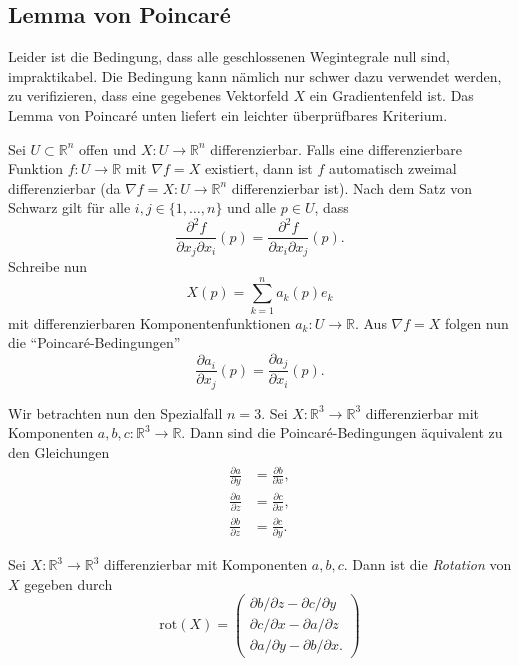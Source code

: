 \documentclass[../main.tex]{subfiles}
\begin{document}
\subsection*{Lemma von Poincaré}

Leider ist die Bedingung, dass alle geschlossenen Wegintegrale
null sind, impraktikabel.
Die Bedingung kann nämlich nur schwer dazu verwendet werden,
zu verifizieren, dass eine gegebenes Vektorfeld $X$
ein Gradientenfeld ist.
Das Lemma von Poincaré unten liefert ein leichter überprüfbares
Kriterium.

Sei $U \subset \mathbb{R}^n$ offen
und $X \colon U \to \mathbb{R}^n$ differenzierbar.
Falls eine differenzierbare Funktion
$f \colon U \to \mathbb{R}$ mit $\nabla f = X$ existiert,
dann ist $f$ automatisch zweimal differenzierbar
(da $\nabla f = X \colon U \to \mathbb{R}^n$ differenzierbar ist).
Nach dem Satz von Schwarz gilt für alle
$i, j \in \{1, \dots, n\}$ und alle $p \in U$, dass
\[
  \frac{\partial^2 f}{\partial x_j \partial x_i}(p) =
  \frac{\partial^2 f}{\partial x_i \partial x_j}(p).
\]
Schreibe nun
\[
  X(p) = \sum_{k=1}^{n} a_k(p) e_k
\]
mit differenzierbaren Komponentenfunktionen $a_k \colon U \to \mathbb{R}$.
Aus $\nabla f = X$ folgen nun die ``Poincaré-Bedingungen''
\[
  \frac{\partial a_i}{\partial x_j}(p) = \frac{\partial a_j}{\partial x_i}(p).
\]

Wir betrachten nun den Spezialfall $n = 3$.
Sei $X \colon \mathbb{R}^3 \to \mathbb{R}^3$
differenzierbar mit Komponenten $a, b, c \colon \mathbb{R}^3 \to \mathbb{R}$.
Dann sind die Poincaré-Bedingungen äquivalent zu den Gleichungen
\begin{align*}
  \frac{\partial a}{\partial y} &= \frac{\partial b}{\partial x}, \\
  \frac{\partial a}{\partial z} &= \frac{\partial c}{\partial x}, \\
  \frac{\partial b}{\partial z} &= \frac{\partial c}{\partial y}.
\end{align*}

\begin{definition}
  Sei $X \colon \mathbb{R}^3 \to \mathbb{R}^3$ differenzierbar
  mit Komponenten $a, b, c$.
  Dann ist die \emph{Rotation} von $X$ gegeben durch
  \[
    \text{rot}(X) =
    \begin{pmatrix}
      {\partial b}/{\partial z} - {\partial c}/{\partial y} \\
      {\partial c}/{\partial x} - {\partial a}/{\partial z} \\
      {\partial a}/{\partial y} - {\partial b}/{\partial x}.
    \end{pmatrix}
  \]
\end{definition}
\end{document}
